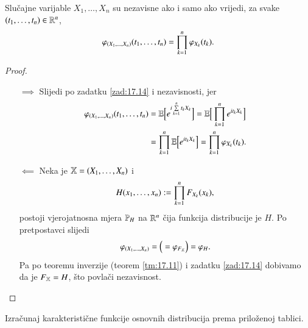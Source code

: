 \begin{tm}  \label{tm:17.15}
    Slu\v cajne varijable $X_1, \ldots, X_n$ su nezavisne ako i samo ako vrijedi, za svake $(t_1, \ldots, t_n) \in \mathbb{R}^n$,
    \begin{equation*}
        \varphi_{(X_1, \ldots, X_n)} (t_1 , \ldots, t_n) = \prod\limits_{k = 1}^{n} \varphi_{X_k} (t_k).
    \end{equation*}
\end{tm}

\begin{proof}
    \quad \\
    \begin{itemize}
        \item[$\implies$]
        Slijedi po zadatku \ref{zad:17.14} i nezavisnosti, jer
        \begin{equation*}
            \begin{aligned}
                \varphi_{(X_1, \ldots, X_n)} (t_1, \ldots, t_n) &= \mathbb{E} \Big[ e^{i \sum\limits_{k = 1}^{n} t_k X_k} \Big] = \mathbb{E} \Big[ \prod\limits_{k = 1}^{n} e^{i t_k X_k} \Big]\\
                &= \prod\limits_{k = 1}^{n} \mathbb{E} \Big[ e^{i t_k X_k} \Big] = \prod\limits_{k = 1}^{n} \varphi_{X_k} (t_k).
            \end{aligned}
        \end{equation*}
        \item[$\impliedby$]
        Neka je $\mathbb{X} = (X_1, \ldots, X_n)$ i
        \begin{equation*}
            H (x_1, \ldots, x_n) := \prod\limits_{k = 1}^{n} F_{X_k} (x_k),
        \end{equation*}
        postoji vjerojatnosna mjera $\mathbb{P}_H$ na $\mathbb{R}^n$ \v cija funkcija distribucije je $H$.
        Po pretpostavci slijedi
        \begin{equation*}
            \varphi_{(X_1, \ldots, X_n)} = \Big( = \varphi_{F_{\mathbb{X}}} \Big) = \varphi_H.
        \end{equation*}
        Pa po teoremu inverzije (teorem \ref{tm:17.11}) i zadatku \ref{zad:17.14} dobivamo da je $F_{\mathbb{X}} = H$, \v sto povla\v ci nezavisnost.
    \end{itemize}
\end{proof}

\begin{zad} \label{zad:17.16}
    Izra\v cunaj karakteristi\v cne funkcije osnovnih distribucija prema prilo\v zenoj tablici.
\end{zad}

